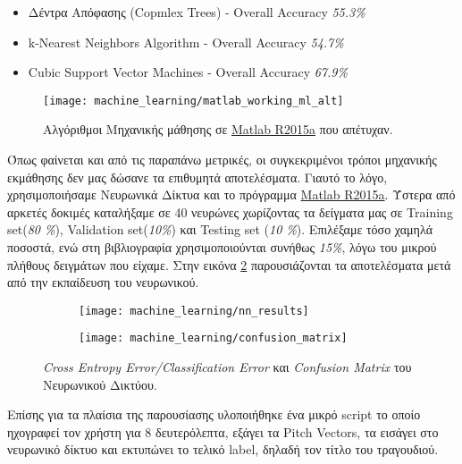 \begin{itemize}
  \item Δέντρα Απόφασης (Copmlex Trees) - Overall Accuracy \textit{55.3\%}  
  \item k-Nearest Neighbors Algorithm 	- Overall Accuracy \textit{54.7\%}
  \item Cubic Support Vector Machines	- Overall Accuracy \textit{67.9\%}
\end{itemize}

\begin{figure}
        \centering
        \vspace{-20pt}\texttt{[image: machine\_learning/matlab\_working\_ml\_alt]}
        \vspace{-20pt}\caption{Αλγόριθμοι Μηχανικής μάθησης σε \href{https://www.mathworks.com/products/matlab.html}{Matlab R2015a} που απέτυχαν.}
        \label{fig:matlab_ml_alg}
\end{figure}

Όπως φαίνεται και από τις παραπάνω μετρικές, οι συγκεκριμένοι τρόποι μηχανικής εκμάθησης δεν μας δώσανε τα επιθυμητά αποτελέσματα. Γιαυτό το λόγο, χρησιμοποιήσαμε Νευρωνικά Δίκτυα και το πρόγραμμα \href{https://www.mathworks.com/products/matlab.html}{Matlab R2015a}. %
Ύστερα από αρκετές δοκιμές καταλήξαμε σε 40 νευρώνες χωρίζοντας τα δείγματα μας σε Training set(\textit{80 \%}), Validation set(\textit{10\%}) και Testing set (\textit{10 \%}). Επιλέξαμε τόσο χαμηλά ποσοστά, ενώ στη βιβλιογραφία χρησιμοποιούνται συνήθως \textit{15\%}, λόγω του μικρού πλήθους δειγμάτων που είχαμε. Στην εικόνα \ref{fig:matlab-results} παρουσιάζονται τα αποτελέσματα μετά από την εκπαίδευση του νευρωνικού.

\begin{figure}[htb]
    \centering
    \begin{subfigure}{0.5\linewidth}
        \texttt{[image: machine\_learning/nn\_results]}
    \end{subfigure}\hfill
    \begin{subfigure}{\linewidth}
        \texttt{[image: machine\_learning/confusion\_matrix]}
    \end{subfigure}
    \caption{\textit{Cross Entropy Error/Classification Error} και \textit{Confusion Matrix} του Νευρωνικού Δικτύου.}
    \label{fig:matlab-results}
\end{figure}

Επίσης για τα πλαίσια της παρουσίασης υλοποιήθηκε ένα μικρό script το οποίο ηχογραφεί τον χρήστη για 8 δευτερόλεπτα, εξάγει τα Pitch Vectors, τα εισάγει στο νευρωνικό δίκτυο και εκτυπώνει το τελικό label, δηλαδή τον τίτλο του τραγουδιού. 